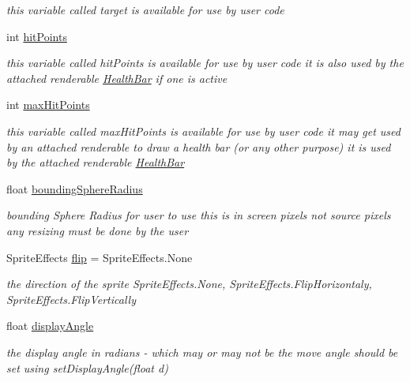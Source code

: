 \begin{DoxyCompactItemize}
\begin{DoxyCompactList}\small\item\em this variable called target is available for use by user code \end{DoxyCompactList}\item 
int \mbox{\hyperlink{class_r_c___framework_1_1_sprite3_abe8d4ab8316448c8d9ff2da22b680380}{hit\+Points}}
\begin{DoxyCompactList}\small\item\em this variable called hit\+Points is available for use by user code it is also used by the attached renderable \mbox{\hyperlink{class_r_c___framework_1_1_health_bar}{Health\+Bar}} if one is active \end{DoxyCompactList}\item 
int \mbox{\hyperlink{class_r_c___framework_1_1_sprite3_a7177e23ee5d4dd93ca4972e9798be680}{max\+Hit\+Points}}
\begin{DoxyCompactList}\small\item\em this variable called max\+Hit\+Points is available for use by user code it may get used by an attached renderable to draw a health bar (or any other purpose) it is used by the attached renderable \mbox{\hyperlink{class_r_c___framework_1_1_health_bar}{Health\+Bar}} \end{DoxyCompactList}\item 
float \mbox{\hyperlink{class_r_c___framework_1_1_sprite3_a6f76b1e09c665b5a930cb86c34c86429}{bounding\+Sphere\+Radius}}
\begin{DoxyCompactList}\small\item\em bounding Sphere Radius for user to use this is in screen pixels not source pixels any resizing must be done by the user \end{DoxyCompactList}\item 
Sprite\+Effects \mbox{\hyperlink{class_r_c___framework_1_1_sprite3_a2320b0a1f529f8b9998377a5690c2878}{flip}} = Sprite\+Effects.\+None
\begin{DoxyCompactList}\small\item\em the direction of the sprite Sprite\+Effects.\+None, Sprite\+Effects.\+Flip\+Horizontaly, Sprite\+Effects.\+Flip\+Vertically \end{DoxyCompactList}\item 
float \mbox{\hyperlink{class_r_c___framework_1_1_sprite3_aed8fd08f1d911727fb48d3c456be713a}{display\+Angle}}
\begin{DoxyCompactList}\small\item\em the display angle in radians -\/ which may or may not be the move angle should be set using set\+Display\+Angle(float d) \end{DoxyCompactList}\item 

\end{DoxyCompactItemize}
